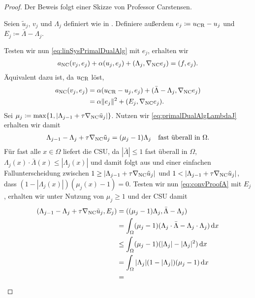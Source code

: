 \begin{proof}
  Der Beweis folgt einer Skizze von Professor Carstensen.
  
  Seien $\tilde{u}_j$, $v_j$ und $\Lambda_j$ definiert wie in
  .
  Definiere außerdem $e_j \coloneqq u_\textup{CR}-u_j$ und $E_j\coloneqq
  \bar\Lambda-\Lambda_j$. 

  Testen wir nun \eqref{eq:linSysPrimalDualAlg} mit $e_j$, erhalten wir
  \begin{align*}
    a_\textup{NC}(v_j,e_j) + \alpha(u_j,e_j) 
    + (\Lambda_j,\nabla_\textup{NC} e_j)
    = 
    (f,e_j).
  \end{align*}
  Äquivalent dazu ist, da $u_\textup{CR}$  löst, 
  \begin{align}
    \label{eq:convProofE}
    a_\textup{NC}(v_j,e_j) &= 
    \alpha(u_\textup{CR}-u_j,e_j) 
    + (\bar\Lambda-\Lambda_j,\nabla_\textup{NC} e_j) \notag\\
    &= 
    \alpha\Vert e_j\Vert^2
    + (E_j,\nabla_\textup{NC} e_j).
  \end{align}
  Sei $\mu_j\coloneqq \max\{1,|\Lambda_{j-1}+\tau
  \nabla_\textup{NC} \tilde{u}_j|\}$.
  Nutzen wir \eqref{eq:primalDualAlgLambdaJ} erhalten wir damit
  \begin{align}
    \label{eq:convProofA}
    \Lambda_{j-1}-\Lambda_j+\tau \nabla_\textup{NC} \tilde{u}_j 
    = (\mu_j-1)\Lambda_j \quad\text{fast überall in }\Omega.
  \end{align}
  Für fast alle $x\in\Omega$ liefert die CSU, da $|\bar\Lambda|\leq 1$ fast
  überall in $\Omega$,
  $\Lambda_j(x)\cdot\bar\Lambda(x)\leq|\Lambda_j(x)|$ und damit folgt 
  aus  und einer einfachen Fallunterscheidung
  zwischen $1\geq |\Lambda_{j-1}+\tau\nabla_\textup{NC} \tilde{u}_j|$ und
  $1< |\Lambda_{j-1}+\tau\nabla_\textup{NC} \tilde{u}_j|$,
  dass $(1-|\Lambda_j(x)|)(\mu_j(x)-1)=0$.
  Testen wir nun \eqref{eq:convProofA} mit $E_j$, erhalten wir 
  unter Nutzung von $\mu_j\geq 1$ und der CSU damit
  \begin{align*}
    ( \Lambda_{j-1}-\Lambda_j+\tau\gradnc \tilde{u}_j,
    E_j)
    &= 
    ( (\mu_j-1)\Lambda_j,\bar\Lambda-\Lambda_j)\\
    &=
    \int_\Omega
    (\mu_j-1)(\Lambda_j\cdot\bar\Lambda-\Lambda_j\cdot\Lambda_j)\,\mathrm dx\\
    &\leq
    \int_\Omega (\mu_j-1)(|\Lambda_j|-|\Lambda_j|^2)\,\mathrm dx\\
    &=
    \int_\Omega |\Lambda_j|
    (1-|\Lambda_j|)(\mu_j-1)\,\mathrm dx \\
    &=

\end{align*}
\end{proof}
